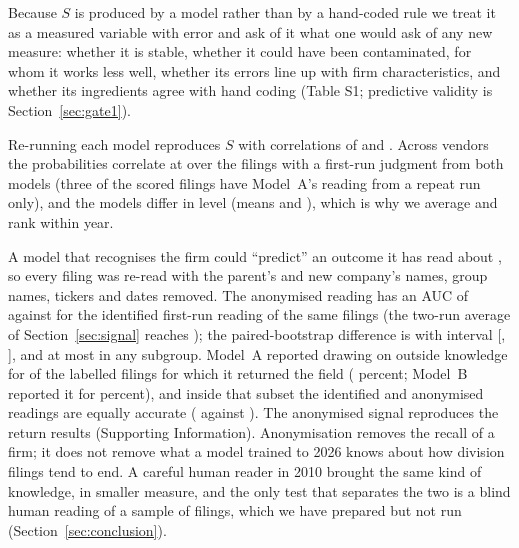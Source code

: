 Because $S$ is produced by a model rather than by a hand-coded rule we treat it as a measured variable with error and ask of it what one would ask of any new measure: whether it is stable, whether it could have been contaminated, for whom it works less well, whether its errors line up with firm characteristics, and whether its ingredients agree with hand coding (Table S1; predictive validity is Section~\ref{sec:gate1}).

Re-running each model reproduces $S$ with correlations of \RepeatCorrA{} and \RepeatCorrB{}. Across vendors the probabilities correlate at \TwoModelCorr{} over the \TwoModelN{} filings with a first-run judgment from both models (three of the \NScored{} scored filings have Model~A's reading from a repeat run only), and the models differ in level (means \TwoModelMeanA{} and \TwoModelMeanB{}), which is why we average and rank within year.

A model that recognises the firm could ``predict'' an outcome it has read about \cite{glasserman2024}, so every filing was re-read with the parent's and new company's names, group names, tickers and dates removed. The anonymised reading has an AUC of \ValAUCAn{} against \ValAUCId{} for the identified first-run reading of the same filings (the two-run average of Section~\ref{sec:signal} reaches \AUCPooledLLM{}); the paired-bootstrap difference is \ValDAUC{} with interval [\ValDAUCLo, \ValDAUCHi], and at most \ValDAUCMaxSub{} in any subgroup. Model~A reported drawing on outside knowledge for \ValSubsetN{} of the \ValOutsideN{} labelled filings for which it returned the field (\ValOutsideA{} percent; Model~B reported it for \ValOutsideB{} percent), and inside that subset the identified and anonymised readings are equally accurate (\ValSubsetAUCId{} against \ValSubsetAUCAn{}). The anonymised signal reproduces the return results (Supporting Information). Anonymisation removes the recall of a firm; it does not remove what a model trained to 2026 knows about how division filings tend to end. A careful human reader in 2010 brought the same kind of knowledge, in smaller measure, and the only test that separates the two is a blind human reading of a sample of filings, which we have prepared but not run (Section~\ref{sec:conclusion}).

